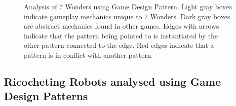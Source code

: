 \documentclass[a4paper]{article}
\begin{document}
\begin{figure}[htb]
\begin{tikzpicture}

  \end{tikzpicture}
\caption{Analysis of 7 Wonders using Game Design Pattern.
Light gray boxes indicate gameplay mechanics unique to 7 Wonders.
Dark gray boxes are abstract mechanics found in other games.
Edges with arrows indicate that the pattern being pointed to is instantiated by the other pattern connected to the edge.
Red edges indicate that a pattern is in conflict with another pattern.}

\label{fig:A7W}
\end{figure}

\newpage
\subsection{Ricocheting Robots analysed using Game Design Patterns}
\end{document}
